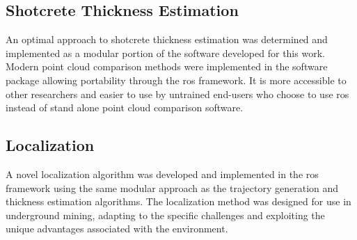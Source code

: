 \subsection{Shotcrete Thickness Estimation}
An optimal approach to shotcrete thickness estimation was determined and implemented as a modular portion of the software developed for this work. Modern point cloud comparison methods were implemented in the software package allowing portability through the \acrshort{ros} framework. It is more accessible to other researchers and easier to use by untrained end-users who choose to use \acrshort{ros} instead of stand alone point cloud comparison software.

\subsection{Localization}
A novel localization algorithm was developed and implemented in the \acrshort{ros} framework using the same modular approach as the trajectory generation and thickness estimation algorithms. The localization method was designed for use in underground mining, adapting to the specific challenges and exploiting the unique advantages associated with the environment.\\
